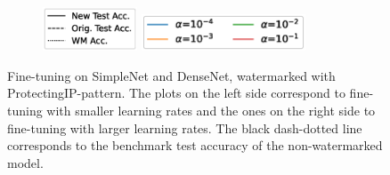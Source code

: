 \begin{figure}
\begin{subfigure}[b]{\textwidth}
         \quad
         \includegraphics[height=1.3cm]{images/finetuning/legend_content_finetuning_linetypes.eps}
         \quad
         \includegraphics[height=1.1cm]{images/finetuning/legend_content_finetuning_largelr_colors.eps}
     \end{subfigure}
     \caption{Fine-tuning on SimpleNet and DenseNet, watermarked with ProtectingIP-pattern. The plots on the left side correspond to fine-tuning with smaller learning rates and the ones on the right side to fine-tuning with larger learning rates. The black dash-dotted line corresponds to the benchmark test accuracy of the non-watermarked model.}
     
     \label{fig:finetuning_simplenet_and_densenet}
\end{figure}